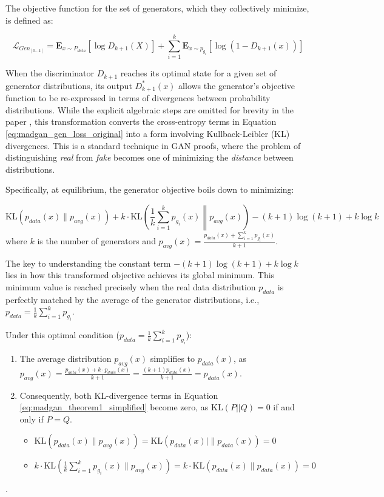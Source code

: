 The objective function for the set of generators, which they collectively minimize, is defined as:

\begin{equation}
\label{eq:madgan_gen_loss_original}
\mathcal{L}_{Gen_{[0...k]}} = \mathbf{E}_{x \sim P_{data}} [ \log D_{k+1}(X) ] + \sum_{i=1}^{k}\mathbf{E}_{x \sim p_{g_i}} [\log (1-D_{k+1}(x))]
\end{equation}

When the discriminator \(D_{k+1}\) reaches its optimal state for a given set of generator distributions, its output \(D^*_{k+1}(x)\) allows the generator's objective function to be re-expressed in terms of divergences between probability distributions. While the explicit algebraic steps are omitted for brevity in the paper \cite{ghosh2018madgan}, this transformation converts the cross-entropy terms in Equation \ref{eq:madgan_gen_loss_original} into a form involving Kullback-Leibler (KL) divergences. This is a standard technique in GAN proofs, where the problem of distinguishing \textit{real} from \textit{fake} becomes one of minimizing the \textit{distance} between distributions.

Specifically, at equilibrium, the generator objective boils down to minimizing:

\begin{equation}
\label{eq:madgan_theorem1_simplified}
\text{KL} \left( p_{data}(x) \| p_{avg}(x) \right) + k \cdot \text{KL} \left( \frac{1}{k}\sum_{i=1}^k p_{g_i}(x) \middle\| p_{avg}(x) \right) - (k+1)\log(k+1) + k\log k
\end{equation}
where \(k\) is the number of generators and \(p_{avg}(x) = \frac{p_{data}(x) + \sum_{i=1}^k p_{g_i}(x)}{k+1}\).

The key to understanding the constant term \( -(k+1)\log(k+1) + k\log k \) lies in how this transformed objective achieves its global minimum. This minimum value is reached precisely when the real data distribution \(p_{data}\) is perfectly matched by the average of the generator distributions, i.e., \(p_{data} = \frac{1}{k}\sum_{i=1}^{k} p_{g_i}\).

\noindent
Under this optimal condition (\(p_{data} = \frac{1}{k}\sum_{i=1}^{k} p_{g_i}\)):
\begin{enumerate}
    \item The average distribution \(p_{avg}(x)\) simplifies to \(p_{data}(x)\), as \\\(p_{avg}(x) = \frac{p_{data}(x) + k \cdot p_{data}(x)}{k+1} = \frac{(k+1)p_{data}(x)}{k+1} = p_{data}(x)\).
    \item Consequently, both KL-divergence terms in Equation \ref{eq:madgan_theorem1_simplified} become zero, as \(\text{KL}(P||Q) = 0\) if and only if \(P=Q\).
    \begin{itemize}
        \item \(\text{KL}(p_{data}(x) \| p_{avg}(x)) = \text{KL}(p_{data}(x)|\| p_{data}(x)) = 0\)
        \item \(k \cdot \text{KL}\left(\frac{1}{k}\sum_{i=1}^k p_{g_i}(x) \| p_{avg}(x)\right) = k \cdot \text{KL}(p_{data}(x) \| p_{data}(x)) = 0\)
    \end{itemize}
\end{enumerate}.


